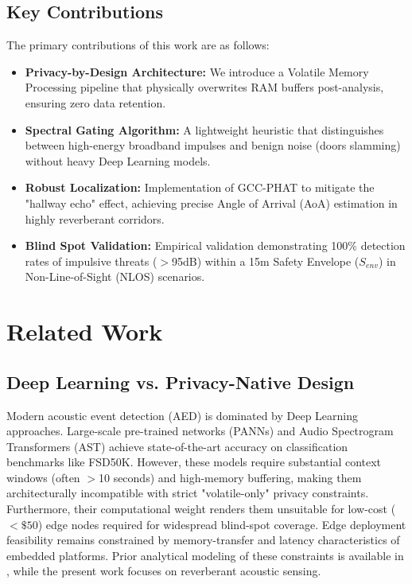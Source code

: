 \documentclass[conference]{IEEEtran}
\begin{document}
\subsection{Key Contributions}
The primary contributions of this work are as follows:
\begin{itemize}
    \item \textbf{Privacy-by-Design Architecture:} We introduce a Volatile Memory Processing pipeline that physically overwrites RAM buffers post-analysis, ensuring zero data retention.
    \item \textbf{Spectral Gating Algorithm:} A lightweight heuristic that distinguishes between high-energy broadband impulses and benign noise (doors slamming) without heavy Deep Learning models.
    \item \textbf{Robust Localization:} Implementation of GCC-PHAT to mitigate the "hallway echo" effect, achieving precise Angle of Arrival (AoA) estimation in highly reverberant corridors.
    \item \textbf{Blind Spot Validation:} Empirical validation demonstrating 100\% detection rates of impulsive threats ($>$95dB) within a 15m Safety Envelope ($S_{env}$) in Non-Line-of-Sight (NLOS) scenarios.
\end{itemize}

\section{Related Work}

\subsection{Deep Learning vs. Privacy-Native Design}
Modern acoustic event detection (AED) is dominated by Deep Learning approaches. Large-scale pre-trained networks (PANNs) \cite{b22} and Audio Spectrogram Transformers (AST) \cite{b23} achieve state-of-the-art accuracy on classification benchmarks like FSD50K. However, these models require substantial context windows (often $>$10 seconds) and high-memory buffering, making them architecturally incompatible with strict "volatile-only" privacy constraints. Furthermore, their computational weight renders them unsuitable for low-cost ($<\$50$) edge nodes required for widespread blind-spot coverage. Edge deployment feasibility remains constrained by memory-transfer and latency characteristics of embedded platforms. Prior analytical modeling of these constraints is available in \cite{b38}, while the present work focuses on reverberant acoustic sensing.
\end{document}
